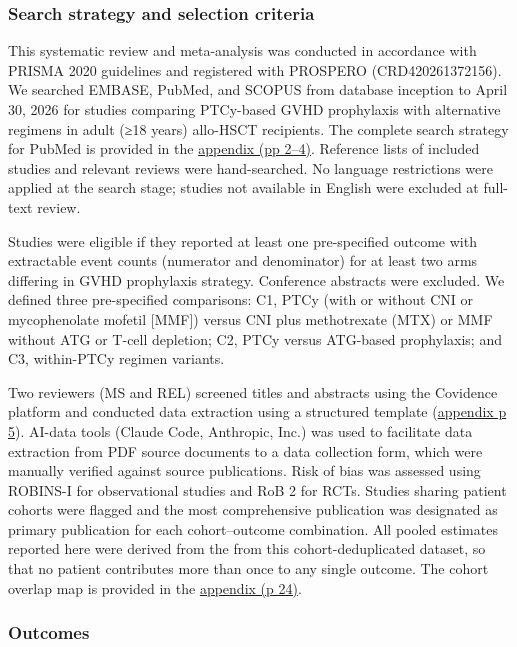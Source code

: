 \documentclass[
  british,
  8.6pt,
  a4paper,
  twocolumn]{article}
\begin{document}
\subsubsection{Search strategy and selection
criteria}\label{search-strategy-and-selection-criteria}

This systematic review and meta-analysis was conducted in accordance
with PRISMA 2020 guidelines and registered with PROSPERO
(CRD420261372156). We searched EMBASE, PubMed, and SCOPUS from database
inception to April 30, 2026 for studies comparing PTCy-based GVHD
prophylaxis with alternative regimens in adult (≥18 years) allo-HSCT
recipients. The complete search strategy for PubMed is provided in the
\href{appendix-preview.html\#s1.-search-strategy}{appendix (pp 2--4)}.
Reference lists of included studies and relevant reviews were
hand-searched. No language restrictions were applied at the search
stage; studies not available in English were excluded at full-text
review.

Studies were eligible if they reported at least one pre-specified
outcome with extractable event counts (numerator and denominator) for at
least two arms differing in GVHD prophylaxis strategy. Conference
abstracts were excluded. We defined three pre-specified comparisons: C1,
PTCy (with or without CNI or mycophenolate mofetil {[}MMF{]}) versus CNI
plus methotrexate (MTX) or MMF without ATG or T-cell depletion; C2, PTCy
versus ATG-based prophylaxis; and C3, within-PTCy regimen variants.

Two reviewers (MS and REL) screened titles and abstracts using the
Covidence platform and conducted data extraction using a structured
template
(\href{appendix-preview.html\#s3.-characteristics-of-included-studies}{appendix
p 5}). AI-data tools (Claude Code, Anthropic, Inc.) was used to
facilitate data extraction from PDF source documents to a data
collection form, which were manually verified against source
publications. Risk of bias was assessed using ROBINS-I for observational
studies and RoB 2 for RCTs. Studies sharing patient cohorts were flagged
and the most comprehensive publication was designated as primary
publication for each cohort--outcome combination. All pooled estimates
reported here were derived from the from this cohort-deduplicated
dataset, so that no patient contributes more than once to any single
outcome. The cohort overlap map is provided in the
\href{appendix-preview.html\#s12.-cohort-overlap}{appendix (p 24)}.

\subsubsection{Outcomes}\label{outcomes}
\end{document}
